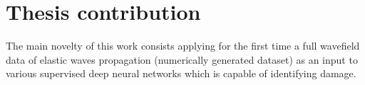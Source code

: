 \section{Thesis contribution}
\label{sec15}

The main novelty of this work consists applying for the first time a full wavefield data of elastic waves propagation (numerically generated dataset) as an input to various supervised deep neural networks which is capable of identifying damage.